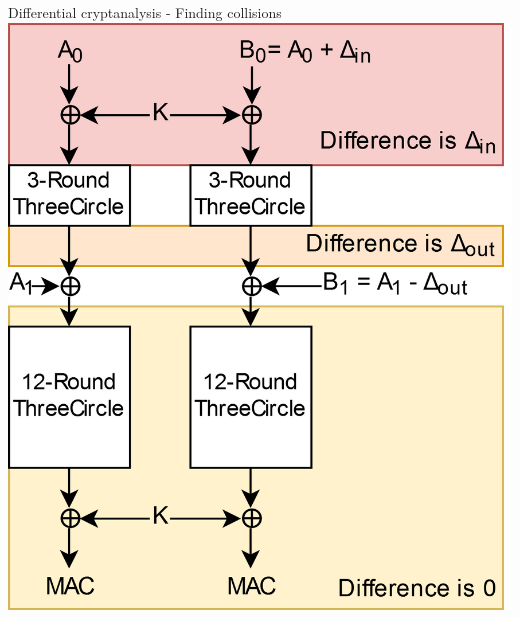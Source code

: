 \documentclass{beamer}
\begin{document}
\begin{frame}{Differential cryptanalysis - Finding collisions}
\centering\includegraphics[scale=0.145]{Collision.png}
\end{frame}
\end{document}
